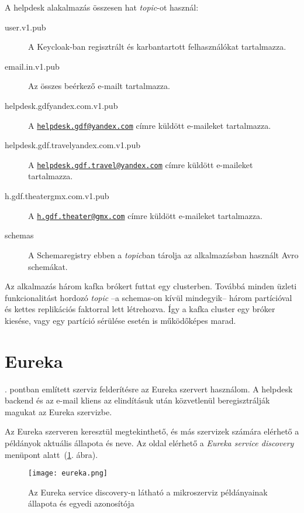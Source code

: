 A helpdesk alakalmazás összesen hat \textit{topic}-ot használ:
\begin{description}
	\item[user.v1.pub] A Keycloak-ban regisztrált és karbantartott felhasználókat tartalmazza.
	
	\item[email.in.v1.pub] Az összes beérkező  e-mailt tartalmazza.
	
	\item[helpdesk.gdf\textunderscore yandex.com.v1.pub] A  \href{mailto:helpdesk.gdf@yandex.com}{\nolinkurl{helpdesk.gdf@yandex.com}} címre küldött e-maileket tartalmazza.
	
	\item[helpdesk.gdf.travel\textunderscore yandex.com.v1.pub] A  \href{mailto:helpdesk.gdf.travel@yandex.com}{\nolinkurl{helpdesk.gdf.travel@yandex.com}} címre küldött e-maileket tartalmazza.
	
	
	\item[h.gdf.theater\textunderscore gmx.com.v1.pub] A \href{mailto:h.gdf.theater@gmx.com}{\nolinkurl{h.gdf.theater@gmx.com}} címre küldött e-maileket tartalmazza.
	
	\item[\textunderscore schemas] A Schemaregistry ebben a \textit{topic}ban tárolja az alkalmazásban használt Avro schemákat.
\end{description}


Az alkalmazás három kafka brókert futtat egy clusterben. Továbbá minden üzleti funkcionalitást hordozó \textit{topic} --a \textunderscore schemas-on kívül mindegyik-- három partícióval és kettes replikációs faktorral lett létrehozva.
Így a kafka cluster egy bróker kiesése, vagy egy partíció sérülése esetén is működőképes marad.


\section{Eureka}
. pontban említett szerviz felderítésre az Eureka szervert használom. A helpdesk backend és az e-mail kliens az elindításuk után közvetlenül beregisztrálják magukat az Eureka szervizbe.

Az Eureka szerveren keresztül megtekinthető, és más szervizek számára elérhető a példányok aktuális állapota és neve. Az oldal elérhető a \textit{Eureka service discovery} menüpont alatt~(\ref{fig:eureka}. ábra).


\begin{figure}[hbt] 
	\centering
	\texttt{[image: eureka.png]}
	\caption[Az Eureka service discovery felülete]{Az Eureka service discovery-n látható a mikroszerviz példányainak állapota és egyedi azonosítója}
	\label{fig:eureka}
\end{figure}

